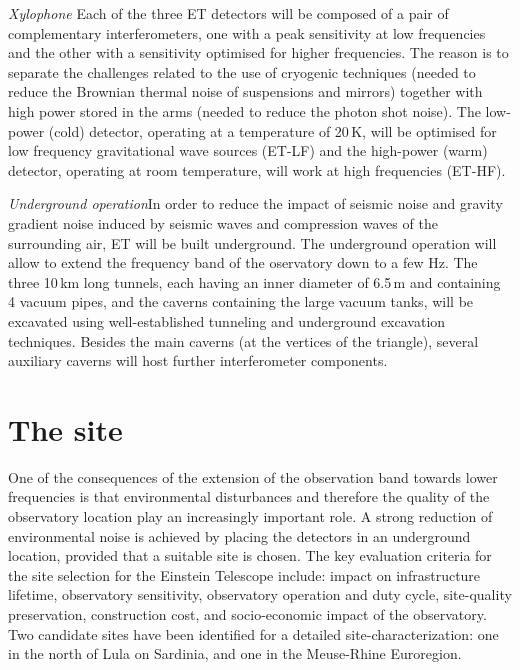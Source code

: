\textit{Xylophone}\quad 
Each of the three ET detectors will be composed of a pair of complementary interferometers, one with a peak sensitivity at low frequencies and the other with a sensitivity optimised for higher frequencies. The reason is to separate the challenges related to the use of cryogenic techniques (needed to reduce the Brownian thermal noise of suspensions and mirrors) together with high power stored in the arms (needed to reduce the photon shot noise). The 
low-power (cold) detector, operating at a temperature of 20\,K,  will be optimised for low frequency gravitational wave sources (ET-LF) and the high-power (warm) detector, operating at room temperature, will work at high frequencies (ET-HF). 

\textit{Underground operation}\quad In order to reduce the impact of seismic noise and gravity gradient noise induced by seismic waves and 
compression waves of the surrounding air, ET will be built underground. The underground operation will allow to extend the frequency band of the oservatory down to a few Hz. 
The three 10\,km long tunnels, each having an inner diameter of 6.5\,m and containing 4 vacuum pipes, and the caverns containing the large vacuum tanks, will be excavated using well-established tunneling and underground excavation techniques. 
Besides the main caverns (at the vertices of the triangle), several auxiliary caverns will host further interferometer components. 

\section*{The site}
One of the consequences of the extension of the observation band towards lower frequencies is that environmental disturbances and therefore the quality of the observatory location play an increasingly important role. A strong reduction of environmental noise is achieved by placing the detectors in an underground location, provided that a suitable site is chosen.
The key evaluation criteria for the site selection for the Einstein Telescope include: impact on infrastructure lifetime, observatory sensitivity, observatory operation and duty cycle, site-quality preservation, construction cost, and socio-economic impact of the observatory. Two candidate sites have been identified for a detailed site-characterization:
one in the north of Lula on Sardinia, and one in the Meuse-Rhine Euroregion. 

